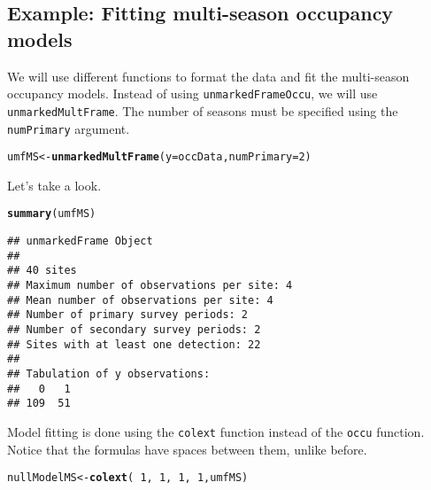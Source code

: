 \documentclass[12pt]{article}\usepackage[]{graphicx}\usepackage[]{color}
\makeatletter
\newcommand{\hlnum}[1]{\textcolor[rgb]{0.686,0.059,0.569}{#1}}%
\newcommand{\hlopt}[1]{\textcolor[rgb]{0,0,0}{#1}}%
\newcommand{\hlstd}[1]{\textcolor[rgb]{0.345,0.345,0.345}{#1}}%
\newcommand{\hlkwb}[1]{\textcolor[rgb]{0.69,0.353,0.396}{#1}}%
\newcommand{\hlkwc}[1]{\textcolor[rgb]{0.333,0.667,0.333}{#1}}%
\newcommand{\hlkwd}[1]{\textcolor[rgb]{0.737,0.353,0.396}{\textbf{#1}}}%
\newenvironment{kframe}{%
 \def\at@end@of@kframe{}%
 \ifinner\ifhmode%
  \def\at@end@of@kframe{\end{minipage}}%
  \begin{minipage}{\columnwidth}%
 \fi\fi%
 \def\FrameCommand##1{\hskip\@totalleftmargin \hskip-\fboxsep
 \colorbox{shadecolor}{##1}\hskip-\fboxsep
     \hskip-\linewidth \hskip-\@totalleftmargin \hskip\columnwidth}%
 \MakeFramed {\advance\hsize-\width
   \@totalleftmargin\z@ \linewidth\hsize
   \@setminipage}}%
 {\par\unskip\endMakeFramed%
 \at@end@of@kframe}
\newenvironment{knitrout}{}{} %
\makeatother
\begin{document}
\subsection*{Example: Fitting multi-season occupancy models}


We will use different functions to format the data and fit the
multi-season occupancy models. Instead of using
\texttt{unmarkedFrameOccu}, we will use
\texttt{unmarkedMultFrame}. The number of seasons must be specified
using the \texttt{numPrimary} argument.


\begin{knitrout}
\color{fgcolor}\begin{kframe}
\begin{alltt}
\hlstd{umfMS} \hlkwb{<-} \hlkwd{unmarkedMultFrame}\hlstd{(}\hlkwc{y}\hlstd{=occData,} \hlkwc{numPrimary}\hlstd{=}\hlnum{2}\hlstd{)}
\end{alltt}
\end{kframe}
\end{knitrout}

Let's take a look.

\begin{knitrout}
\color{fgcolor}\begin{kframe}
\begin{alltt}
\hlkwd{summary}\hlstd{(umfMS)}
\end{alltt}
\begin{verbatim}
## unmarkedFrame Object
## 
## 40 sites
## Maximum number of observations per site: 4 
## Mean number of observations per site: 4 
## Number of primary survey periods: 2 
## Number of secondary survey periods: 2 
## Sites with at least one detection: 22 
## 
## Tabulation of y observations:
##   0   1 
## 109  51
\end{verbatim}
\end{kframe}
\end{knitrout}

Model fitting is done using the \texttt{colext} function instead of
the \texttt{occu} function. Notice that the formulas have spaces
between them, unlike before.


\begin{knitrout}
\color{fgcolor}\begin{kframe}
\begin{alltt}
\hlstd{nullModelMS} \hlkwb{<-} \hlkwd{colext}\hlstd{(}\hlopt{~}\hlnum{1}\hlstd{,} \hlopt{~}\hlnum{1}\hlstd{,} \hlopt{~}\hlnum{1}\hlstd{,} \hlopt{~}\hlnum{1}\hlstd{, umfMS)}
\end{alltt}
\end{kframe}
\end{knitrout}
\end{document}
